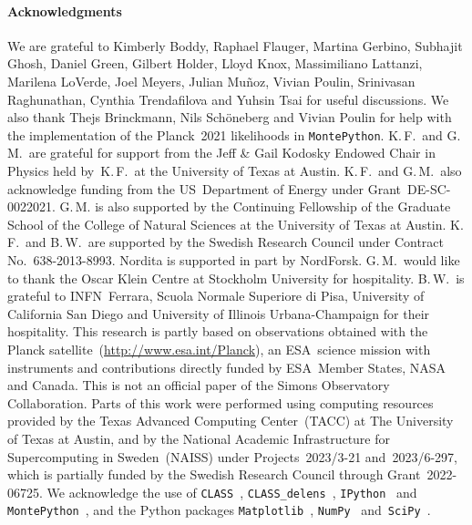 \documentclass[11pt]{article}
\numberwithin{equation}{section}
\begin{document}
\vskip20pt
\paragraph{Acknowledgments}
We are grateful to Kimberly Boddy, Raphael Flauger, Martina Gerbino, Subhajit Ghosh, Daniel Green, Gilbert Holder, Lloyd Knox, Massimiliano Lattanzi, Marilena LoVerde, Joel Meyers, Julian Muñoz, Vivian Poulin, Srinivasan Raghunathan, Cynthia Trendafilova and Yuhsin Tsai for useful discussions. We also thank Thejs Brinckmann, Nils Schöneberg and Vivian Poulin for help with the implementation of the Planck~2021 likelihoods in \texttt{MontePython}. K.\,F.~and G.\,M.~are grateful for support from the Jeff \& Gail Kodosky Endowed Chair in Physics held by~K.\,F.\ at the University of Texas at Austin. K.\,F.~and G.\,M.~also acknowledge funding from the US~Department of Energy under Grant~\mbox{DE-SC-0022021}. G.\,M. is also supported by the Continuing Fellowship of the Graduate School of the College of Natural Sciences at the University of Texas at Austin. K.\,F.~and B.\,W.~are supported by the Swedish Research Council under Contract No.~\mbox{638-2013-8993}. Nordita is supported in part by NordForsk. G.\,M.~would like to thank the Oscar Klein Centre at Stockholm University for hospitality. B.\,W.~is grateful to INFN~Ferrara, Scuola Normale Superiore di Pisa, University of California San Diego and University of Illinois Urbana-Champaign for their hospitality. This research is partly based on observations obtained with the Planck satellite~(\href{http://www.esa.int/Planck}{http:/\!/www.esa.int/Planck}), an ESA~science mission with instruments and contributions directly funded by ESA~Member States, NASA and Canada. This is not an official paper of the Simons Observatory Collaboration. Parts of this work were performed using computing resources provided by the Texas Advanced Computing Center~(TACC) at The University of Texas at Austin, and by the National Academic Infrastructure for Supercomputing in Sweden~(NAISS) under Projects~\mbox{2023/3-21} and~\mbox{2023/6-297}, which is partially funded by the Swedish Research Council through Grant~\mbox{2022-06725}. We acknowledge the use of \texttt{CLASS}~\cite{Blas:2011rf}, \texttt{CLASS\_delens}~\cite{Hotinli:2021umk}, \texttt{IPython}~\cite{Perez:2007ipy} and \texttt{MontePython}~\cite{Audren:2012wb, Brinckmann:2018cvx}, and the Python packages \texttt{Matplotlib}~\cite{Hunter:2007mat}, \texttt{NumPy}~\cite{Harris:2020xlr} and~\texttt{SciPy}~\cite{Virtanen:2019joe}.
\end{document}
